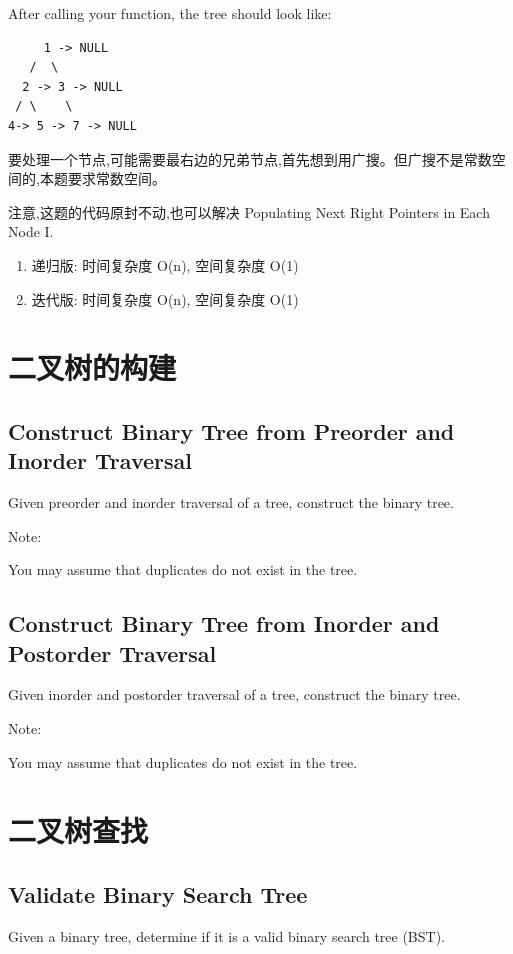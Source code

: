 \documentclass[12pt]{book}
\begin{document}
After calling your function, the tree should look like:
\lstset{language=java,label= ,caption= ,numbers=none}
\begin{lstlisting}
     1 -> NULL
   /  \
  2 -> 3 -> NULL
 / \    \
4-> 5 -> 7 -> NULL
\end{lstlisting}

要处理一个节点,可能需要最右边的兄弟节点,首先想到用广搜。但广搜不是常数空间的,本题要求常数空间。

注意,这题的代码原封不动,也可以解决 Populating Next Right Pointers in Each Node I.
\begin{enumerate}
\item 递归版: 时间复杂度 O(n), 空间复杂度 O(1)
\label{sec-4-1-12-1}
\item 迭代版: 时间复杂度 O(n), 空间复杂度 O(1)
\label{sec-4-1-12-2}
\end{enumerate}



\section{二叉树的构建}
\label{sec-4-2}
\subsection{Construct Binary Tree from Preorder and Inorder Traversal}
\label{sec-4-2-1}
Given preorder and inorder traversal of a tree, construct the binary tree.

Note:

You may assume that duplicates do not exist in the tree.

\subsection{Construct Binary Tree from Inorder and Postorder Traversal}
\label{sec-4-2-2}
Given inorder and postorder traversal of a tree, construct the binary tree.

Note:

You may assume that duplicates do not exist in the tree.

\section{二叉树查找}
\label{sec-4-3}

\subsection{Validate Binary Search Tree}
\label{sec-4-3-1}
Given a binary tree, determine if it is a valid binary search tree (BST).
\end{document}
